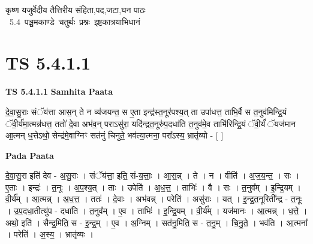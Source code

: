 \documentclass[17pt]{extarticle}
\begin{document}
\begin{titlepage}
    \begin{center}
 
\begin{sanskrit}
    { \Huge
    कृष्ण यजुर्वेदीय तैत्तिरीय संहिता,पद,जटा,घन पाठः 
    }
    \\
    \vspace{2.5cm}
    \mbox{ \Huge
    5.4      पञ्चमकाण्डे चतुर्थः प्रश्नः इष्टकात्रयाभिधानं   }
\end{sanskrit}
\end{center}

\end{titlepage}
\tableofcontents
\pagebreak

\section*{ TS 5.4.1.1 }

\textbf{TS 5.4.1.1 } \newline
\textbf{Samhita Paata} \newline

दे॒वा॒सु॒राः संॅय॑त्ता आस॒न् ते न व्य॑जयन्त॒ स ए॒ता इन्द्र॑स्त॒नूर॑पश्य॒त् ता उपा॑धत्त॒ ताभि॒र्वै स त॒नुव॑मिन्द्रि॒यं ॅवी॒र्य॑मा॒त्मन्न॑धत्त॒ ततो॑ दे॒वा अभ॑व॒न् पराऽसु॑रा॒ यदि॑न्द्रत॒नूरु॑प॒दधा॑ति त॒नुव॑मे॒व ताभि॑रिन्द्रि॒यं ॅवी॒र्यं॑ ॅयज॑मान आ॒त्मन् ध॒त्तेऽथो॒ सेन्द्र॑मे॒वाग्निꣳ सत॑नुं चिनुते॒ भव॑त्या॒त्मना॒ परा᳚ऽस्य॒ भ्रातृ॑व्यो - [  ] \newline

\textbf{Pada Paata} \newline

दे॒वा॒सु॒रा इति॑ देव - अ॒सु॒राः । संॅय॑त्ता॒ इति॒ सं-य॒त्ताः॒ । आ॒स॒न्न् । ते । न । वीति॑ । अ॒ज॒य॒न्त॒ । सः । ए॒ताः । इन्द्रः॑ । त॒नूः । अ॒प॒श्य॒त् । ताः । उपेति॑ । अ॒ध॒त्त॒ । ताभिः॑ । वै । सः । त॒नुव᳚म् । इ॒न्द्रि॒यम् । वी॒र्य᳚म् । आ॒त्मन्न् । अ॒ध॒त्त॒ । ततः॑ । दे॒वाः । अभ॑वन्न् । परेति॑ । असु॑राः । यत् । इ॒न्द्र॒त॒नूरिती᳚न्द्र - त॒नूः । उ॒प॒दधा॒तीत्यु॑प - दधा॑ति । त॒नुव᳚म् । ए॒व । ताभिः॑ । इ॒न्द्रि॒यम् । वी॒र्य᳚म् । यज॑मानः । आ॒त्मन्न् । ध॒त्ते॒ । अथो॒ इति॑ । सैन्द्र॒मिति॒ स - इ॒न्द्र॒म् । ए॒व । अ॒ग्निम् । सत॑नु॒मिति॒ स - त॒नु॒म् । चि॒नु॒ते॒ । भव॑ति । आ॒त्मना᳚ । परेति॑ । अ॒स्य॒ । भ्रातृ॑व्यः ।  \newline




\end{document}
